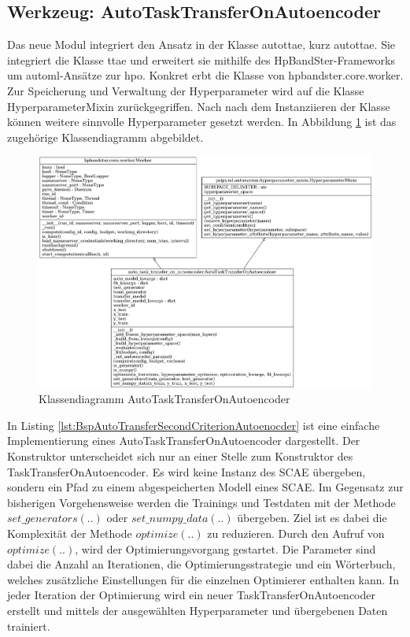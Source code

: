 	\subsection{Werkzeug: AutoTaskTransferOnAutoencoder}
	\label{subsec:AutoTaskTransferOnAutoencoder}
	Das neue Modul integriert den Ansatz in der Klasse \acl{autottae}, kurz \ac{autottae}. Sie integriert die Klasse \acl{ttae} und erweitert sie mithilfe des HpBandSter-Frameworks um \ac{automl}-Ansätze zur \ac{hpo}. Konkret erbt die Klasse von hpbandster.core.worker. Zur Speicherung und Verwaltung der Hyperparameter wird auf die Klasse HyperparameterMixin zurückgegriffen. Nach nach dem Instanziieren der Klasse können weitere sinnvolle Hyperparameter gesetzt werden.
	In Abbildung \ref{img:KlassendiagrammAutoTaskTransferOnAutoencoder}  ist das zugehörige Klassendiagramm abgebildet. 
	\begin{figure}[h]
		\centering
		\includegraphics[width=1\textwidth, center]{bilder/Klassendiagramme/AutoTTAE.png}
		\caption[Klassendiagramm AutoTaskTransferOnAutoencoder]{Klassendiagramm AutoTaskTransferOnAutoencoder}
		\label{img:KlassendiagrammAutoTaskTransferOnAutoencoder}
	\end{figure}  
	In Listing \ref{lst:BspAutoTransferSecondCriterionAutoenocder} ist eine einfache Implementierung eines AutoTaskTransferOnAutoencoder dargestellt. Der Konstruktor unterscheidet sich nur an einer Stelle zum Konstruktor des TaskTransferOnAutoencoder. Es wird keine Instanz des SCAE übergeben, sondern ein Pfad zu einem abgespeicherten Modell eines SCAE. 
	Im Gegensatz zur bisherigen Vorgehensweise werden die Trainings und Testdaten mit der Methode $set\_generators(..)$  oder $set\_numpy\_data(..)$ übergeben. Ziel ist es dabei die Komplexität der Methode $optimize(..)$ zu reduzieren. Durch den Aufruf von $optimize(..)$, wird der Optimierungsvorgang gestartet. Die Parameter sind dabei die Anzahl an Iterationen, die Optimierungsstrategie und ein Wörterbuch, welches zusätzliche Einstellungen für die einzelnen Optimierer enthalten kann. In jeder Iteration der Optimierung wird ein neuer TaskTransferOnAutoencoder erstellt und mittels der ausgewählten Hyperparameter und übergebenen Daten trainiert. 
